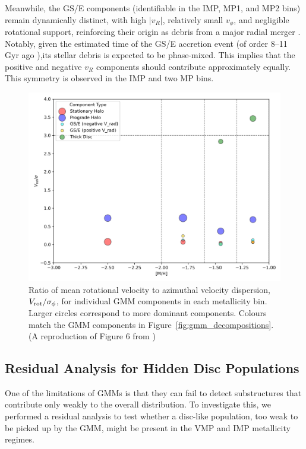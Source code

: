 \documentclass[a4paper,12pt]{article}
\begin{document}
Meanwhile, the GS/E components (identifiable in the IMP, MP1, and MP2 bins) remain dynamically 
distinct, with high $|v_R|$, relatively small $v_\phi$, and negligible rotational support, reinforcing 
their origin as debris from a major radial merger \citep{Helmi2018}. Notably, given 
the estimated time of the GS/E accretion event (of order 8–11 Gyr ago \citep{Gallart2019,Belokurov2020,DiMatteo2019}),its stellar 
debris is expected to be phase-mixed. This 
implies that the positive and negative $v_R$ components should contribute approximately equally. 
This symmetry is observed in the IMP and two MP bins. 


\begin{figure}[H]
    \centering
    \includegraphics[width=\linewidth]{../figures/v_over_sigma_per_component.png}
    \caption{Ratio of mean rotational velocity to azimuthal velocity dispersion, 
    $V_{\rm rot} / \sigma_\phi$, for individual GMM components in each metallicity bin. 
    Larger circles correspond to more dominant components. Colours match the GMM components 
    in Figure~\ref{fig:gmm_decompositions}.(A reproduction of Figure 6 from \citet{zhang2024existencemetalpoordiscmilky})}
    \label{fig:v_over_sigma}
\end{figure}

\subsection{Residual Analysis for Hidden Disc Populations}

One of the limitations of GMMs is that they can fail to detect substructures that contribute 
only weakly to the overall distribution. To investigate this, we performed a residual analysis to test 
whether a disc-like population, too weak to be picked up by the GMM, might be present 
in the VMP and IMP metallicity regimes.
\end{document}
